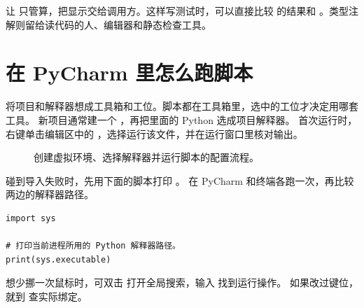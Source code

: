 \begin{pythonictip}
让  只管算，把显示交给调用方。这样写测试时，可以直接比较
 的结果和 。类型注解则留给读代码的人、编辑器和静态检查工具。
\end{pythonictip}


\section{在 PyCharm 里怎么跑脚本}

将项目和解释器想成工具箱和工位。脚本都在工具箱里，选中的工位才决定用哪套工具。
新项目通常建一个 ，再把里面的 Python 选成项目解释器。
首次运行时，右键单击编辑区中的 ，选择运行该文件，并在运行窗口里核对输出。

\begin{figure}[htbp]
  \centering
  \caption*{创建虚拟环境、选择解释器并运行脚本的配置流程。}
\end{figure}

\begin{pycharmpractice}
碰到导入失败时，先用下面的脚本打印 。
在 PyCharm 和终端各跑一次，再比较两边的解释器路径。
\end{pycharmpractice}

\begin{lstlisting}[title={\code{check_interpreter.py}}]
import sys

# 打印当前进程所用的 Python 解释器路径。
print(sys.executable)
\end{lstlisting}

\begin{pycharmtip}
想少挪一次鼠标时，可双击  打开全局搜索，输入  找到运行操作。
如果改过键位，就到  查实际绑定。
\end{pycharmtip}

